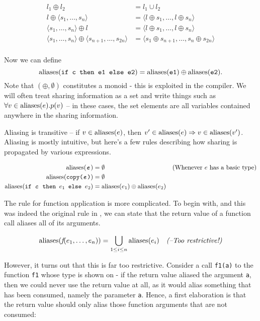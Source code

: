 \begin{align*}
  l_{1} \oplus l_{2} &= l_{1} \cup l_{2} \\
  l \oplus \langle s_{1}, \ldots, s_{n} \rangle &= \langle l \oplus s_1, \ldots, l \oplus s_n \rangle \\
   \langle s_{1}, \ldots, s_{n} \rangle \oplus l &= \langle l \oplus s_1, \ldots, l \oplus s_n \rangle \\
  \langle s_{1}, \ldots, s_{n} \rangle \oplus \langle s_{n+1}, \ldots, s_{2n} \rangle &= \langle s_{1} \oplus s_{n+1}, \ldots, s_{n} \oplus s_{2n} \rangle \\
\end{align*}

Now we can define
\[
\textrm{aliases}(\texttt{if c then e1 else e2}) = \textrm{aliases}(\texttt{e1}) \oplus \textrm{aliases}(\texttt{e2}).
\]
Note that $(\oplus, \emptyset)$ constitutes a monoid - this is
exploited in the \LO{} compiler.  We will often treat sharing
information as a set and write things such as $\forall
v\in\textrm{aliases}(e).p(v)$ -- in these cases, the set elements are all
variables contained anywhere in the sharing information.

Aliasing is transitive -- if $v\in\textrm{aliases}(e)$, then
$v'\in\textrm{aliases}(e)\Rightarrow v\in\textrm{aliases}(v')$.  Aliasing is mostly
intuitive, but here's a few rules describing how sharing is propagated
by various expressions.

\begin{align*}
  \textrm{aliases}(\texttt{\textit{e}}) &= \emptyset & (\text{Whenever $e$ has a basic type}) \\
  \textrm{aliases}(\texttt{copy(\textit{e})}) &= \emptyset \\
  \textrm{aliases}(\texttt{if \textit{c} then ${e}_{1}$ else ${e}_{2}$}) &= \textrm{aliases}(e_{1}) \oplus \textrm{aliases}(e_{2}) \\
\end{align*}

The rule for function application is more complicated.  To begin with,
and this was indeed the original rule in \LO{}, we can state that the
return value of a function call aliases all of its arguments.

\begin{align*}
  \textrm{aliases}(\textit{f}(e_{1}, \ldots, e_{n})) &= \bigcup_{1 \leq i \leq n} \textrm{aliases}(e_{i}) & \textit{(--Too restrictive!)}
\end{align*}

However, it turns out that this is far too restrictive.  Consider a
call \texttt{f1(a)} to the function \texttt{f1} whose type is shown on
 - if the return value aliased the
argument \texttt{a}, then we could never use the return value at all,
as it would alias something that has been consumed, namely the
parameter \texttt{a}.  Hence, a first elaboration is that the return
value should only alias those function arguments that are not
consumed:

